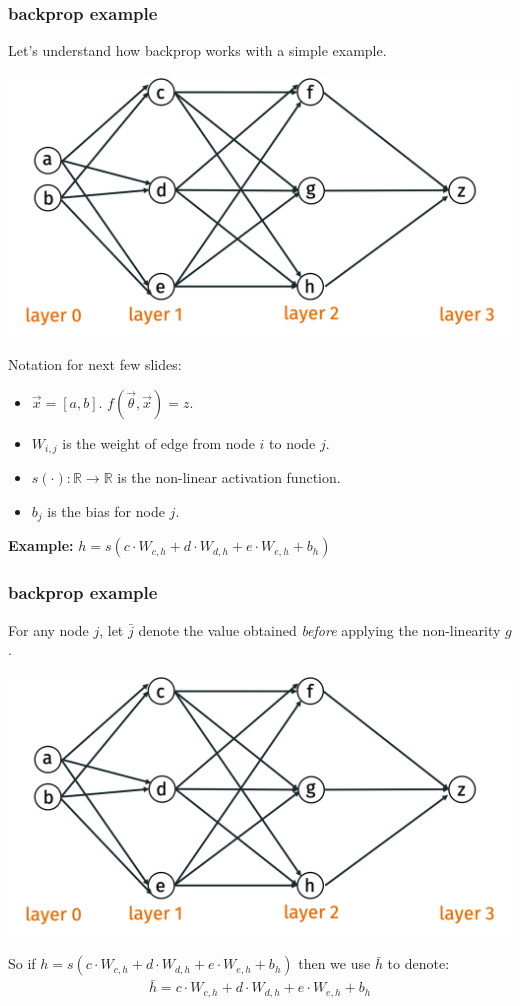 \documentclass[handout,compress]{beamer}
\newcommand{\R}{\mathbb{R}}
\begin{document}
\begin{frame}
	\frametitle{backprop example}
	\small
	Let's understand how backprop works with a simple example.
	\vspace{-.5em}
	\begin{center}
		\includegraphics[width=.6\textwidth]{backpro_example.png}
		\vspace{-1em}
	\end{center}
Notation for next few slides:
\vspace{-1em}
\begin{itemize}
	\item $\vec{x} = [a,b]$. $f(\vec{\theta}, \vec{x}) = z$.
	\item $W_{i,j}$ is the weight of edge from node $i$ to node $j$. 
	\item $s(\cdot): \R\rightarrow \R$ is the non-linear activation function. 
	\item $b_{j}$ is the bias for node $j$.
\end{itemize}
	 \textbf{Example:} $h = s(c\cdot W_{c,h} + d\cdot W_{d,h} + e\cdot W_{e,h} + b_h)$
\end{frame}

\begin{frame}
	\frametitle{backprop example}
	For any node $j$, let $\bar{j}$ denote the value obtained \emph{before} applying the non-linearity $g$.
	\begin{center}
		\includegraphics[width=.6\textwidth]{backpro_example.png}
		\vspace{-1em}
	\end{center}
So if $h = s(c\cdot W_{c,h} + d\cdot W_{d,h} + e\cdot W_{e,h} + b_h)$ then we use $\bar{h}$ to denote:
\begin{align*}
\bar{h} = c\cdot W_{c,h} + d\cdot W_{d,h} + e\cdot W_{e,h} + b_h
\end{align*}
\end{frame}
\end{document}
